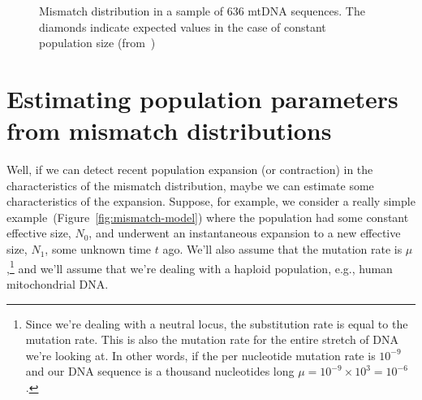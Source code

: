 \documentclass[12pt]{article}
\begin{document}
\begin{figure}
\begin{center}
\end{center}
\caption{Mismatch distribution in a sample of 636 mtDNA sequences. The
  diamonds indicate expected values in the case of constant population 
  size (from~\cite{Harpending-etal-1998})}\label{fig:mismatch-humans} 
\end{figure}

\section*{Estimating population parameters from mismatch distributions}

Well, if we can detect recent population expansion (or contraction) in
the characteristics of the mismatch distribution, maybe we can
estimate some characteristics of the expansion. Suppose, for example,
we consider a really simple example~(Figure~\ref{fig:mismatch-model})
where the population had some constant effective size, $N_0$, and
underwent an instantaneous expansion to a new effective size, $N_1$,
some unknown time $t$ ago. We'll also assume that the mutation rate is
$\mu$,\footnote{Since we're dealing with a neutral locus, the
  substitution rate is equal to the mutation rate. This is also the
  mutation rate for the entire stretch of DNA we're looking at. In
  other words, if the per nucleotide mutation rate is $10^{-9}$ and
  our DNA sequence is a thousand nucleotides long $\mu = 10^{-9}\times
  10^3 = 10^{-6}$.} and we'll assume that we're dealing with a haploid
population, e.g., human mitochondrial DNA.
\end{document}
